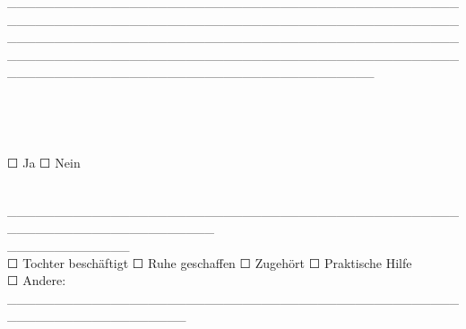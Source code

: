 \_\_\_\_\_\_\_\_\_\_\_\_\_\_\_\_\_\_\_\_\_\_\_\_\_\_\_\_\_\_\_\_\_\_\_\_\_\_\_\_\_\_\_\_\_\_\_\_\_\_\_\_\_\_\_\_\_\_\_\_\_\_\_\_\_\_\_\_\_\_\_\_\_\_\_\_\_\_\_\_\_\_\_\_\_\_\_\_\_\_\_\_\_\_\_\_\_\_\_\_\_\_\_\_\_\_\_\_\_\_\_\_\_\_\_\_\_\_\_\_\_\_\_\_\_\_\_\_\_\_\_\_\_\_\_\_\_\_\_\_\_\_\_\_\_\_\_\_\_\_\_\_\_\_\_\_\_\_\_\_\_\_\_\_\_\_\_\_\_\_\_\_\_\_\_\_\_\_\_\_\_\_\_\_\_\_\_\_\_\_\_\_\_\_\_\_\_\_\_\_\_\_\_\_\_\_\_\_\_\_\_\_\_\_\_\_\_\_\_\_\_\_\_\_\_\_\_\_\_\_\_

\hfill\break
\hfill\break

\hypertarget{support-netzwerk}{%
\subsection[👥 \ul{\textbf{\textcolor{ctmmBlue}{\1}}}]{\texorpdfstring{\protect\hypertarget{support-netzwerk}{}{}👥 \ul{\textbf{\textcolor{ctmmBlue}{\1}}}}{👥 SUPPORT-NETZWERK}}\label{support-netzwerk}}

\hypertarget{freunde-aktiviert}{%
\subsubsection[\textbf{\textcolor{ctmmBlue}{\1}}]{\texorpdfstring{\protect\hypertarget{freunde-aktiviert}{}{}\textbf{\textcolor{ctmmBlue}{\1}}}{Freunde aktiviert:}}\label{freunde-aktiviert}}

☐ Ja ☐ Nein

\textbf{\textcolor{ctmmBlue}{\1}}\\
\textbf{\textcolor{ctmmBlue}{\1}} \_\_\_\_\_\_\_\_\_\_\_\_\_\_\_\_\_\_\_\_\_\_\_\_\_\_\_\_\_\_\_\_\_\_\_\_\_\_\_\_\_\_\_\_\_\_\_\_\_\_\_\_\_\_\_\_\_\_\_\_\_\_\_\_\_\_\_\_\_\_\\
\textbf{\textcolor{ctmmBlue}{\1}} \_\_\_\_\_\_\_\_\_\_\_\_\_ \textbf{\textcolor{ctmmBlue}{\1}}\\
☐ Tochter beschäftigt ☐ Ruhe geschaffen ☐ Zugehört ☐ Praktische Hilfe\\
☐ Andere: \_\_\_\_\_\_\_\_\_\_\_\_\_\_\_\_\_\_\_\_\_\_\_\_\_\_\_\_\_\_\_\_\_\_\_\_\_\_\_\_\_\_\_\_\_\_\_\_\_\_\_\_\_\_\_\_\_\_\_\_\_\_\_\_\_\_\_

\hfill\break
\hfill\break

\hypertarget{professionelle-hilfe}{%
\subsubsection[\textbf{\textcolor{ctmmBlue}{\1}}]{\texorpdfstring{\protect\hypertarget{professionelle-hilfe}{}{}\textbf{\textcolor{ctmmBlue}{\1}}}{Professionelle Hilfe:}}\label{professionelle-hilfe}}

